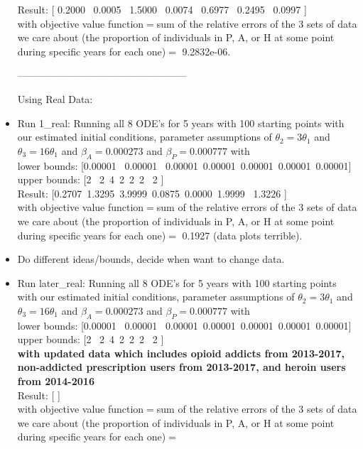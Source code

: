 \documentclass[12pt]{article}
\begin{document}
\begin{itemize}
Result: [     0.2000 \   0.0005  \  1.5000 \   0.0074 \   0.6977 \   0.2495 \   0.0997 ]\\
with objective value function$=$sum of the relative errors of the 3 sets of data we care about (the proportion of individuals in P, A, or H at some point during specific years for each one)$=$ 9.2832e-06. 


--------------------------------------------------- \\
\pagebreak

Using Real Data:

\item Run 1\_real: Running all 8 ODE's for 5 years with 100 starting points with our estimated initial conditions, parameter assumptions of $\theta_2=3 \theta_1$ and $\theta_3=16\theta_1$ and $\beta_A=0.000273$ and $\beta_P=0.000777$ with \\
lower bounds: [0.00001  \ 0.00001 \ 0.00001\ 0.00001\ 0.00001\ 0.00001\ 0.00001] \\
upper bounds: [2 \ 2\  4\  2\  2\   2 \ 2 ] \\

Result: [0.2707\    1.3295\    3.9999\    0.0875\    0.0000\    1.9999 \   1.3226 ]\\
with objective value function$=$sum of the relative errors of the 3 sets of data we care about (the proportion of individuals in P, A, or H at some point during specific years for each one)$=$ 0.1927 (data plots terrible). \\

\item Do different ideas/bounds, decide when want to change data. \\







\item Run later\_real: Running all 8 ODE's for 5 years with 100 starting points with our estimated initial conditions, parameter assumptions of $\theta_2=3 \theta_1$ and $\theta_3=16\theta_1$ and $\beta_A=0.000273$ and $\beta_P=0.000777$ with \\
lower bounds: [0.00001  \ 0.00001 \ 0.00001\ 0.00001\ 0.00001\ 0.00001\ 0.00001] \\
upper bounds: [2 \ 2\  4\  2\  2\   2 \ 2 ] \\
\textbf{with updated data which includes opioid addicts from 2013-2017, non-addicted prescription users from 2013-2017, and heroin users from 2014-2016} \\
Result: [ ]\\
with objective value function$=$sum of the relative errors of the 3 sets of data we care about (the proportion of individuals in P, A, or H at some point during specific years for each one)$=$ 

\end{itemize}
\end{document}
